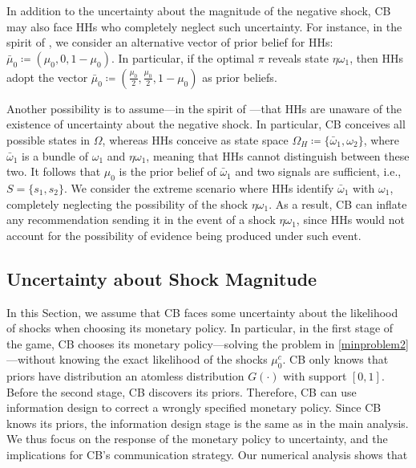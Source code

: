 \documentclass[12pt,a4paper]{article}
\begin{document}
In addition to the uncertainty about the magnitude of the negative shock, CB may also face HHs who completely neglect such uncertainty. For instance, in the spirit of \cite{galperti2019persuasion}, we consider an alternative vector of prior belief for HHs: $\bar{\mu}_0\coloneqq\left(\mu_0,0,1-\mu_0\right)$. In particular, if the optimal $\pi$ reveals state $\eta \omega_1$, then HHs adopt the vector $\bar{\mu}_0\coloneqq\left(\frac{\mu_0}{2},\frac{\mu_0}{2},1-\mu_0\right)$ as prior beliefs.

Another possibility is to assume---in the spirit of \cite{evsyukova2024information}---that HHs are unaware of the existence of uncertainty about the negative shock. In particular, CB conceives all possible states in $\Omega$, whereas HHs conceive as state space $\Omega_{H}\coloneqq\{\bar{\omega}_1,\omega_2\}$, where $\bar{\omega}_1$ is a bundle of $\omega_1$ and $\eta\omega_1$, meaning that HHs cannot distinguish between these two. It follows that $\mu_0$ is the prior belief of $\bar{\omega}_1$ and two signals are sufficient, i.e., $S=\{s_1,s_2\}$. We consider the extreme scenario where HHs identify $\bar{\omega}_1$ with $\omega_1$, completely neglecting the possibility of the shock $\eta \omega_1$. As a result, CB can inflate any recommendation sending it in the event of a shock $\eta \omega_1$, since HHs would not account for the possibility of evidence being produced under such event.

\subsection{Uncertainty about Shock Magnitude}

In this Section, we assume that CB faces some uncertainty about the likelihood of shocks when choosing its monetary policy. In particular, in the first stage of the game, CB chooses its monetary policy---solving the problem in \eqref{minproblem2}---without knowing the exact likelihood of the shocks $\mu_0^c$. CB only knows that priors have distribution an atomless distribution $G(\cdot)$ with support $[0,1]$. Before the second stage, CB discovers its priors. Therefore, CB can use information design to correct a wrongly specified monetary policy. Since CB knows its priors, the information design stage is the same as in the main analysis. We thus focus on the response of the monetary policy to uncertainty, and the implications for CB's communication strategy. Our numerical analysis shows that
\end{document}
